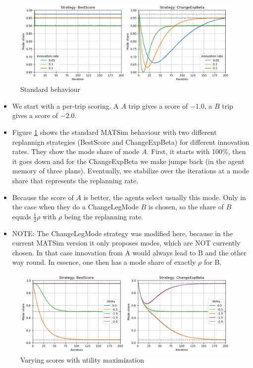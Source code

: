 \documentclass[a4paper]{article}
\begin{document}
\begin{figure}[h!]
    \centering
    \includegraphics[width=\textwidth]{images/standard_behaviour.png}
    \caption{Standard behaviour}
    \label{fig:standard_behaviour}
\end{figure}

\begin{itemize}
  \item We start with a per-trip scoring. A $A$ trip gives a score of $-1.0$, a $B$ trip gives a score
  of $-2.0$.
  \item Figure \ref{fig:standard_behaviour} shows the standard MATSim behaviour with two different
  replannign strategies (BestScore and ChangeExpBeta) for different innovation rates. They show
  the mode share of mode $A$. First, it starts with 100\%, then it goes down and for the ChangeExpBeta
  we make jumps back (in the agent memory of three plans). Eventually, we stabilize over the
  iterations at a mode share that represents the replanning rate.
  \item Because the score of $A$ is better, the agents select usually this mode. Only in the case when
  they do a ChangeLegMode $B$ is chosen, so the share of $B$ equals $\frac{1}{2} \rho$ with $\rho$ being the
  replanning rate.
  \item NOTE: The ChangeLegMode strategy was modified here, because in the current MATSim version it only
  proposes modes, which are NOT currently chosen. In that case innovation from A would always lead to
  B and the other way round. In essence, one then has a mode share of exactly $\rho$ for B.
\end{itemize}

\begin{figure}[h!]
    \centering
    \includegraphics[width=\textwidth]{images/vary_scores.png}
    \caption{Varying scores with utility maximization}
    \label{fig:vary_scores}
\end{figure}
\end{document}
